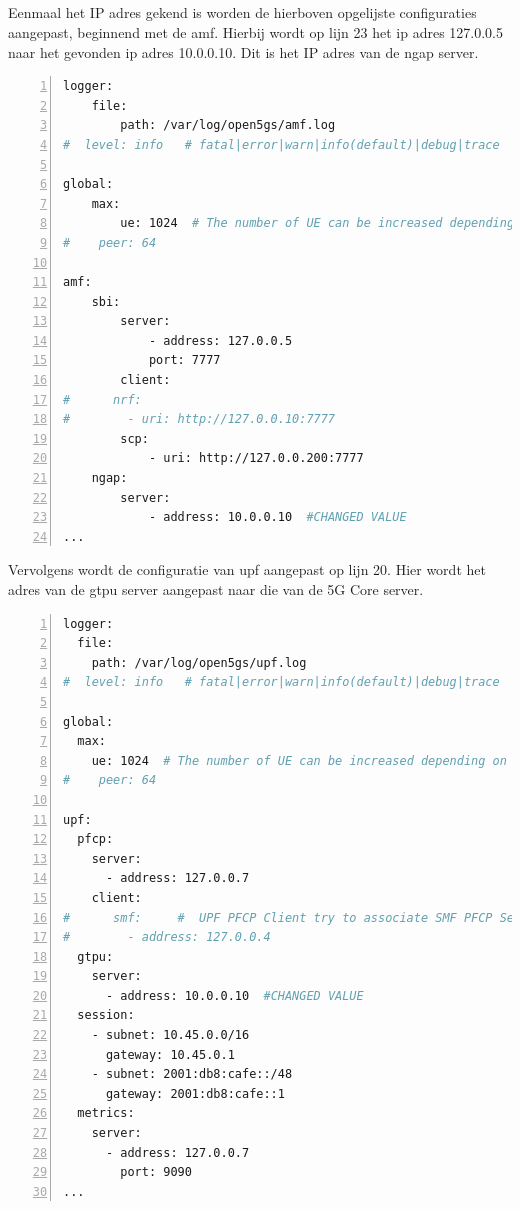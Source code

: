 \subsection{}%
\label{sec:open5gs_amf-upf}%

Eenmaal het IP adres gekend is worden de hierboven opgelijste configuraties aangepast, beginnend met de \gls{amf}. Hierbij wordt op lijn 23 het ip adres 127.0.0.5 naar het gevonden ip adres 10.0.0.10. Dit is het IP adres van de ngap server.

\begin{lstlisting}[basicstyle=\small, frame=single, breaklines=true, postbreak=\mbox{\textcolor{red}{$\hookrightarrow$}\space}, escapeinside ={\%,}, escapechar={!}, numbers=left, language=sh, caption=Open5GS amf configuratie]
logger:
    file:
        path: /var/log/open5gs/amf.log
#  level: info   # fatal|error|warn|info(default)|debug|trace

global:
    max:
        ue: 1024  # The number of UE can be increased depending on memory size.
#    peer: 64

amf:
    sbi:
        server:
            - address: 127.0.0.5
            port: 7777
        client:
#      nrf:
#        - uri: http://127.0.0.10:7777
        scp:
            - uri: http://127.0.0.200:7777
    ngap:
        server:
            - address: 10.0.0.10  #CHANGED VALUE
...
\end{lstlisting}

Vervolgens wordt de configuratie van \gls{upf} aangepast op lijn 20. Hier wordt het adres van de gtpu server aangepast naar die van de 5G Core server.

\begin{lstlisting}[basicstyle=\small, frame=single, breaklines=true, postbreak=\mbox{\textcolor{red}{$\hookrightarrow$}\space}, escapeinside ={\%,}, escapechar={!}, numbers=left, language=sh, caption=Open5GS upf configuratie]
logger:
  file:
    path: /var/log/open5gs/upf.log
#  level: info   # fatal|error|warn|info(default)|debug|trace

global:
  max:
    ue: 1024  # The number of UE can be increased depending on memory size.
#    peer: 64

upf:
  pfcp:
    server:
      - address: 127.0.0.7
    client:
#      smf:     #  UPF PFCP Client try to associate SMF PFCP Server
#        - address: 127.0.0.4
  gtpu:
    server:
      - address: 10.0.0.10  #CHANGED VALUE
  session:
    - subnet: 10.45.0.0/16
      gateway: 10.45.0.1
    - subnet: 2001:db8:cafe::/48
      gateway: 2001:db8:cafe::1
  metrics:
    server:
      - address: 127.0.0.7
        port: 9090
...
\end{lstlisting}

